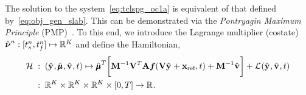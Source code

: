 The solution to the system~\eqref{eq:tclspg_oc1a} is equivalent of that defined by~\eqref{eq:obj_gen_slab}. 
This can be demonstrated via the \textit{Pontryagin Maximum Principle} (PMP)~\cite{optimal_control_book}. To this end, we introduce the Lagrange multiplier (costate) 
$\adjointOCArgnt{n}: [\timeStartArg{n},\timeEndArg{n}] \mapsto \RR{\romdim}$ and define the Hamiltonian, 
\begin{equation}\label{eq:hamiltonian}
\begin{split}
\hamiltonian \; &: \;  (\genstateyDiscreteArgnt{},\adjointDiscreteDumArgnt{},\controllerDiscreteDumArgnt{},t) \mapsto 
 \adjointDiscreteDumArgnt{T} \bigg[  \mass^{-1}\basisspace^T \stweightingMatArgt{n}{t}\velocity(\basisspace \genstateyDiscreteArgnt{} + \stateIntercept,t) + \mass^{-1}\controllerDiscreteDumArgnt{} \bigg] +  \objectiveControlArg{}(\genstateyDiscreteArgnt{},\controllerDiscreteDumArgnt{},t) \\
&: \; \RR{\romdim} \times \RR{\romdim} \times \RR{\romdim} \times [0,T] \rightarrow \RR{}.
\end{split}
\end{equation} 
